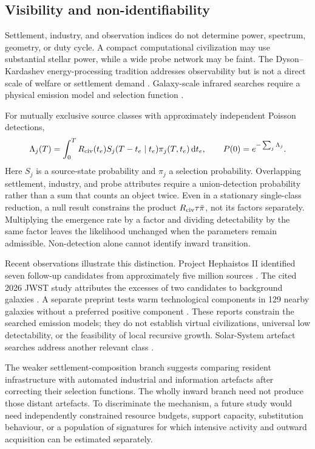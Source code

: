 \subsection{Visibility and non-identifiability}

Settlement, industry, and observation indices do not determine power, spectrum, geometry, or duty cycle. A compact computational civilization may use substantial stellar power, while a wide probe network may be faint. The Dyson--Kardashev energy-processing tradition addresses observability but is not a direct scale of welfare or settlement demand \citep{Dyson1960,Kardashev1964}. Galaxy-scale infrared searches require a physical emission model and selection function \citep{Wright2014a,Wright2014b}.

For mutually exclusive source classes with approximately independent Poisson detections,
\begin{equation}
 \Lambda_j(T)=\int_0^T R_{\rm civ}(t_e)S_j(T-t_e\mid t_e)\pi_j(T,t_e)\,\mathrm{d} t_e,
 \qquad P(0)=e^{-\sum_j\Lambda_j}.
 \label{eq:observations}
\end{equation}
Here $S_j$ is a source-state probability and $\pi_j$ a selection probability. Overlapping settlement, industry, and probe attributes require a union-detection probability rather than a sum that counts an object twice. Even in a stationary single-class reduction, a null result constrains the product $R_{\rm civ}\tau\bar\pi$, not its factors separately. Multiplying the emergence rate by a factor and dividing detectability by the same factor leaves the likelihood unchanged when the parameters remain admissible. Non-detection alone cannot identify inward transition.

Recent observations illustrate this distinction. Project Hephaistos II identified seven follow-up candidates from approximately five million sources \citep{Suazo2024}. The cited 2026 JWST study attributes the excesses of two candidates to background galaxies \citep{Zackrisson2026}. A separate preprint tests warm technological components in 129 nearby galaxies without a preferred positive component \citep{Curtis2026}. These reports constrain the searched emission models; they do not establish virtual civilizations, universal low detectability, or the feasibility of local recursive growth. Solar-System artefact searches address another relevant class \citep{Freitas1983,HaqqMisraKopparapu2012}.

The weaker settlement-composition branch suggests comparing resident infrastructure with automated industrial and information artefacts after correcting their selection functions. The wholly inward branch need not produce those distant artefacts. To discriminate the mechanism, a future study would need independently constrained resource budgets, support capacity, substitution behaviour, or a population of signatures for which intensive activity and outward acquisition can be estimated separately. 

